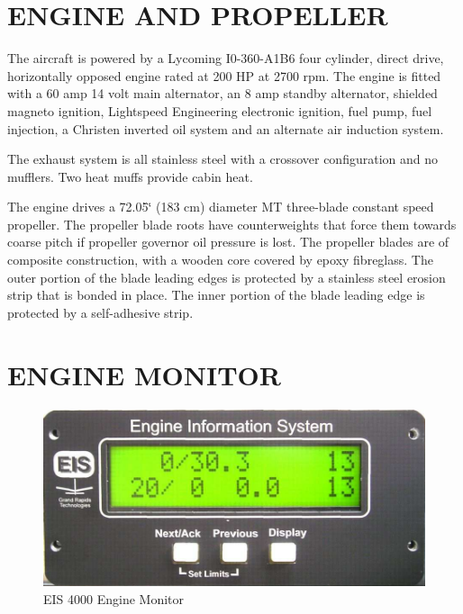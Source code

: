 \section{ENGINE AND PROPELLER}

The aircraft is powered by a Lycoming I0-360-A1B6 four cylinder, direct drive, horizontally opposed engine rated at 200 HP at 2700 rpm. The engine is fitted with a 60 amp 14 volt main alternator, an 8 amp standby alternator, shielded magneto ignition, Lightspeed Engineering electronic ignition, fuel pump, fuel injection, a Christen inverted oil system and an alternate air induction system.

The exhaust system is all stainless steel with a crossover configuration and no mufflers. Two heat muffs provide cabin heat.

The engine drives a 72.05\char`\"{} (183 cm) diameter MT three-blade constant speed propeller.  The propeller blade roots have counterweights that force them towards coarse pitch if propeller governor oil pressure is lost.  The propeller blades are of composite construction, with a wooden core covered by epoxy fibreglass.  The outer portion of the blade leading edges is protected by a stainless steel erosion strip that is bonded in place.  The inner portion of the blade leading edge is protected by a self-adhesive strip.

\section{ENGINE MONITOR} 
\begin{figure}
	
	\includegraphics{../Diagrams/eis1} \caption{EIS 4000 Engine Monitor} 
\end{figure}

